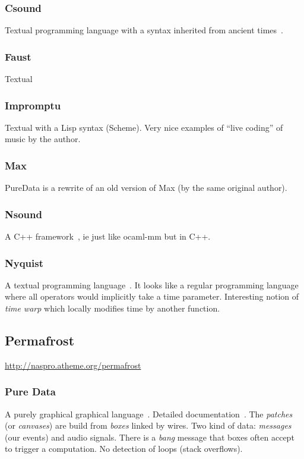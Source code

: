 \documentclass[a4paper,titlepage]{article}
\begin{document}
\subsubsection{Csound}
Textual programming language with a syntax inherited from ancient
times~\cite{csound}.

\subsubsection{Faust}
\cite{faust}
Textual

\subsubsection{Impromptu}
\cite{impromptu} Textual with a Lisp syntax (Scheme). Very nice examples of ``live
coding'' of music by the author.

\subsubsection{Max}
\cite{max}
PureData is a rewrite of an old version of Max (by the same original author).

\subsubsection{Nsound}
A C++ framework~\cite{nsound}, ie just like ocaml-mm but in C++.

\subsubsection{Nyquist}
A textual programming language~\cite{nyquist}. It looks like a regular
programming language where all operators would implicitly take a time
parameter. Interesting notion of \emph{time warp} which locally modifies time by
another function.

\subsection{Permafrost}
\url{http://naspro.atheme.org/permafrost}

\subsubsection{Pure Data}
A purely graphical graphical language~\cite{puredata}. Detailed
documentation~\cite{pd-doc}. The \emph{patches} (or \emph{canvases}) are build
from \emph{boxes} linked by wires. Two kind of data: \emph{messages} (our
events) and audio signals. There is a \emph{bang} message that boxes often
accept to trigger a computation. No detection of loops (stack overflows).
\end{document}
